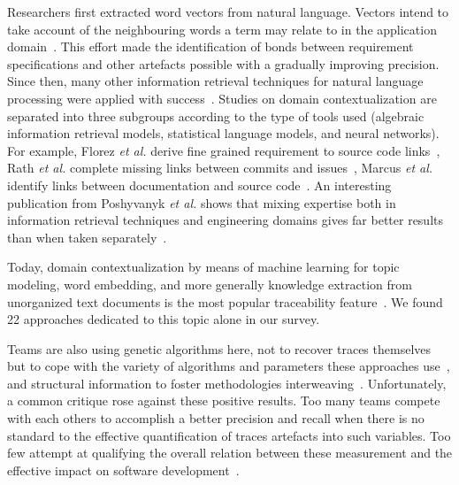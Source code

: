 Researchers first extracted word vectors from natural language. Vectors intend to take account of the neighbouring words a term may relate to in the application domain~\cite{delucia2012-information-retrieval-for-traceability}. This effort made the identification of bonds between requirement specifications and other artefacts possible with a gradually improving precision. Since then, many other information retrieval techniques for natural language processing were applied with success~\cite{arunthavanathan2016-traceability-with-NLP}. Studies on domain contextualization are separated into three subgroups according to the type of tools used (algebraic information retrieval models, statistical language models, and neural networks).  For example, Florez \textit{et al.} derive fine grained requirement to source code links~\cite{florez2019-finegrained-req2code}, Rath \textit{et al.} complete missing links between commits and issues~\cite{rath2018-guo-augmenting-incomplete-traces}, Marcus \textit{et al.} identify links between documentation and source code~\cite{marcus2003-latent-semantic-indexing-for-traceability-LSI}. An interesting publication from Poshyvanyk \textit{et al.} shows that mixing expertise both in information retrieval techniques and engineering domains gives far better results than when taken separately~\cite{poshyvanyk2007}.

Today, domain contextualization by means of machine learning for topic modeling, word embedding, and more generally knowledge extraction from unorganized text documents is the most popular traceability feature~\cite{guo2017-semantically-enhanced-tracebility-deep-learning,wohlrab2020-traceability-organization-process-culture}. We found 22 approaches dedicated to this topic alone in our survey. 

Teams are also using genetic algorithms here, not to recover traces themselves but to cope with the variety of algorithms and parameters these approaches use~\cite{marcen2020-req2model-with-EA-ranking-train-system,panichella2013-genetic-programming-for-effective-topic-modeling}, and structural information to foster methodologies interweaving~\cite{panichella2013-using-structural-information-to-improve-IR-traceability}. Unfortunately, a common critique rose against these positive results. 
Too many teams compete with each others to accomplish a better precision and recall when there is no standard to the effective quantification of traces artefacts into such variables. Too few attempt at qualifying the overall relation between these measurement and the effective impact on software development~\cite{clelandhuang2014-traceability-trends-and-futurte-direction}. 

